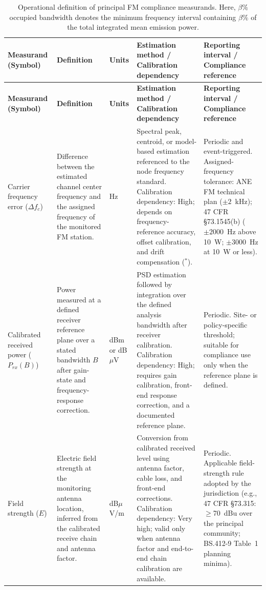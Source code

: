 \documentclass[11pt]{article}
\begin{document}
\begin{longtable}{L{2.4cm}L{3.6cm}L{1.5cm}L{4.0cm}L{2.9cm}}
\caption{Operational definition of principal FM compliance measurands. Here, $\beta\%$ occupied bandwidth denotes the minimum frequency interval containing $\beta\%$ of the total integrated mean emission power.}
\label{tab:measurands}\\
\toprule
{}
\textbf{Measurand (Symbol)} & \textbf{Definition} & \textbf{Units} & \textbf{Estimation method / Calibration dependency} & \textbf{Reporting interval / Compliance reference} \\
\midrule
\endfirsthead
\toprule
{}
\textbf{Measurand (Symbol)} & \textbf{Definition} & \textbf{Units} & \textbf{Estimation method / Calibration dependency} & \textbf{Reporting interval / Compliance reference} \\
\midrule
\endhead
\bottomrule
\endfoot

Carrier frequency error ($\Delta f_c$) &
Difference between the estimated channel center frequency and the assigned frequency of the monitored FM station. &
Hz &
Spectral peak, centroid, or model-based estimation referenced to the node frequency standard. Calibration dependency: High; depends on frequency-reference accuracy, offset calibration, and drift compensation ($^*$). &
Periodic and event-triggered. Assigned-frequency tolerance: ANE FM technical plan ($\pm 2$~kHz); 47 CFR \S73.1545(b) ($\pm 2000$~Hz above 10~W; $\pm 3000$~Hz at 10~W or less). \\

Calibrated received power ($P_{rx}(B)$) &
Power measured at a defined receiver reference plane over a stated bandwidth $B$ after gain-state and frequency-response correction. &
dBm or dB$\mu$V &
PSD estimation followed by integration over the defined analysis bandwidth after receiver calibration. Calibration dependency: High; requires gain calibration, front-end response correction, and a documented reference plane. &
Periodic. Site- or policy-specific threshold; suitable for compliance use only when the reference plane is defined. \\

Field strength ($E$) &
Electric field strength at the monitoring antenna location, inferred from the calibrated receive chain and antenna factor. &
dB$\mu$V/m &
Conversion from calibrated received level using antenna factor, cable loss, and front-end corrections. Calibration dependency: Very high; valid only when antenna factor and end-to-end chain calibration are available. &
Periodic. Applicable field-strength rule adopted by the jurisdiction (e.g., 47 CFR \S73.315: $\ge$70~dBu over the principal community; BS.412-9 Table~1 planning minima). \\


\end{longtable}
\end{document}
